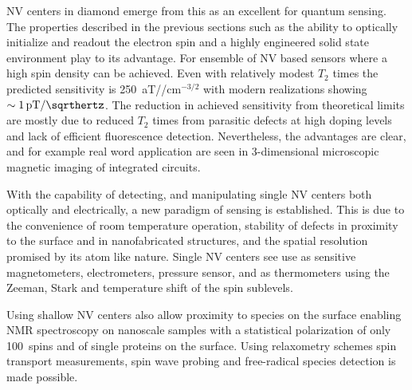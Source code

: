 \gls{NV} centers in diamond emerge from this as an excellent for quantum sensing. The properties described in the previous sections such as the ability to optically initialize and readout the electron spin and a highly engineered solid state environment play to its advantage. For ensemble of \gls{NV} based sensors where a high spin density can be achieved. Even with relatively modest $T_2$ times the predicted sensitivity is \qty{250}{\atto\tesla/\sqrthertz/\centi\meter}$^{-3/2}$\cite{taylorHighsensitivityDiamondMagnetometer2008} with modern realizations showing $\sim\qty{1}{\pico\tesla/\sqrthertz}$\cite{wolfSubpicoteslaDiamondMagnetometry2015}. The reduction in achieved sensitivity from theoretical limits are mostly due to reduced $T_2$ times from parasitic defects at high doping levels and lack of efficient fluorescence detection. Nevertheless, the advantages are clear, and for example real word application are seen in 3-dimensional microscopic magnetic imaging of integrated circuits\cite{garsiThreedimensionalImagingIntegratedcircuit2024a}.

With the capability of detecting, and manipulating single \gls{NV} centers both optically and electrically\cite{gulkaRoomtemperatureControlElectrical2021}, a new paradigm of sensing is established. This is due to the  convenience of room temperature operation, stability of defects in proximity to the surface and in nanofabricated structures, and the spatial resolution promised by its atom like nature. Single \gls{NV} centers see use as sensitive magnetometers\cite{tanakaExperimentalFormationFractional2018}, electrometers\cite{doldeElectricfieldSensingUsing2011a,bianNanoscaleElectricfieldImaging2021}, pressure sensor\cite{hoProbingLocalPressure2020}, and as thermometers\cite{kucskoNanometrescaleThermometryLiving2013} using the Zeeman, Stark and temperature shift of the spin sublevels\cite{degenQuantumSensing2017}. 

Using shallow \gls{NV} centers also allow proximity to species on the surface enabling \gls{NMR} spectroscopy on nanoscale samples with a statistical polarization of only \qty{100}{spins}\cite{staudacherNuclearMagneticResonance2013} and of single proteins on the surface\cite{lovchinskyNuclearMagneticResonance2016}. Using relaxometry\cite{mzykRelaxometryNitrogenVacancy2022} schemes spin transport measurements\cite{wangNoninvasiveMeasurementsSpin2022a}, spin wave probing\cite{vandersarNanometrescaleProbingSpin2015} and free-radical species detection\cite{peronamartinezNanodiamondRelaxometryBasedDetection2020} is made possible.

